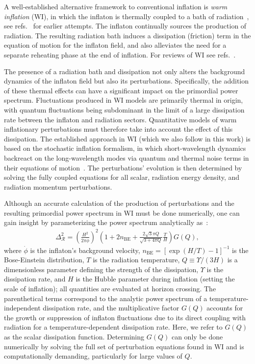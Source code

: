 A well-established alternative framework to conventional inflation is \textit{warm inflation} (WI), in which the inflaton is thermally coupled to a bath of radiation~\cite{Berera:1995ie, Berera:1996fm}, see refs.~\cite{Fang:1980wi, Moss:1985wn, Yokoyama:1987an} for earlier attempts. The inflaton continually sources the production of radiation.  The resulting radiation bath induces a dissipation (friction) term in the equation of motion for the inflaton field, and also alleviates the need for a separate reheating phase at the end of inflation. For reviews of WI see refs.~\cite{Berera:2008ar,Bastero-Gil:2009sdq, Kamali:2023lzq}.

The presence of a radiation bath and dissipation not only alters the background dynamics of the inflaton field but also its perturbations. Specifically, the addition of these thermal effects can have a significant impact on the primordial power spectrum.  Fluctuations produced in WI models are primarily thermal in origin, with quantum fluctuations being subdominant in the limit of a large dissipation rate between the inflaton and radiation sectors. Quantitative models of warm inflationary perturbations must therefore take into account the effect of this dissipation. The established approach in WI (which we also follow in this work) is based on the stochastic inflation formalism, in which short-wavelength dynamics backreact on the long-wavelength modes via quantum and thermal noise terms in their equations of motion~\cite{Ramos:2013nsa}. The perturbations' evolution is then determined by solving the fully coupled equations for all scalar, radiation energy density, and radiation momentum perturbations.  

Although an accurate calculation of the production of perturbations and the resulting primordial power spectrum in WI must be done numerically,
 one can gain insight by parameterizing the power spectrum analytically as~\cite{Hall:2003zp, Graham:2009bf, Bastero-Gil:2011rva, Ramos:2013nsa}:
\begin{align}
    \Delta_{\mathcal{R}}^{2}=\left(\frac{H^{2}}{2 \pi \dot{\phi}}\right)^{2}\left(1 + 2 n_{\mathrm{BE}}+\frac{2 \sqrt{3} \pi Q}{\sqrt{3+4 \pi Q}} \frac{T}{H}\right) G(Q),
\label{eq:ch4-defG}
\end{align}
where $\dot\phi$ is the inflaton's background velocity, $n_{\mathrm{BE}} = [\exp(H/T )-1]^{-1}$ is the Bose-Einstein distribution, $T$ is the radiation temperature,  $Q\equiv \Upsilon/(3H)$ is a dimensionless parameter defining the strength of the dissipation, $\Upsilon$ is the dissipation rate, and $H$ is the Hubble parameter during inflation (setting the scale of inflation); all quantities are evaluated at horizon crossing. The parenthetical terms correspond to the analytic power spectrum of a temperature-independent dissipation rate, and the multiplicative factor $G(Q)$ accounts for the growth or suppression of inflaton fluctuations due to its direct coupling with radiation for a temperature-dependent dissipation rate. Here, we refer to $G(Q)$ as the scalar dissipation function. Determining $G(Q)$ can only be done numerically by solving the full set of perturbation equations found in WI  and is computationally demanding, particularly for large values of $Q$.

